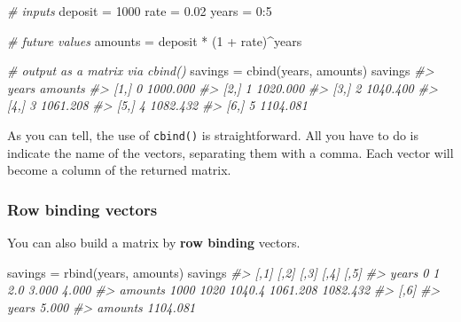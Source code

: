 \documentclass[
]{book}
\newenvironment{Shaded}{\begin{snugshade}}{\end{snugshade}}
\newcommand{\CommentTok}[1]{\textcolor[rgb]{0.56,0.35,0.01}{\textit{#1}}}
\newcommand{\DecValTok}[1]{\textcolor[rgb]{0.00,0.00,0.81}{#1}}
\newcommand{\FloatTok}[1]{\textcolor[rgb]{0.00,0.00,0.81}{#1}}
\newcommand{\FunctionTok}[1]{\textcolor[rgb]{0.00,0.00,0.00}{#1}}
\newcommand{\NormalTok}[1]{#1}
\newcommand{\OtherTok}[1]{\textcolor[rgb]{0.56,0.35,0.01}{#1}}
\newcommand{\SpecialCharTok}[1]{\textcolor[rgb]{0.00,0.00,0.00}{#1}}
\begin{document}
\begin{Shaded}
\begin{Highlighting}[]
\CommentTok{\# inputs}
\NormalTok{deposit }\OtherTok{=} \DecValTok{1000}
\NormalTok{rate }\OtherTok{=} \FloatTok{0.02}
\NormalTok{years }\OtherTok{=} \DecValTok{0}\SpecialCharTok{:}\DecValTok{5}

\CommentTok{\# future values}
\NormalTok{amounts }\OtherTok{=}\NormalTok{ deposit }\SpecialCharTok{*}\NormalTok{ (}\DecValTok{1} \SpecialCharTok{+}\NormalTok{ rate)}\SpecialCharTok{\^{}}\NormalTok{years}

\CommentTok{\# output as a matrix via cbind()}
\NormalTok{savings }\OtherTok{=} \FunctionTok{cbind}\NormalTok{(years, amounts)}
\NormalTok{savings}
\CommentTok{\#\textgreater{}      years  amounts}
\CommentTok{\#\textgreater{} [1,]     0 1000.000}
\CommentTok{\#\textgreater{} [2,]     1 1020.000}
\CommentTok{\#\textgreater{} [3,]     2 1040.400}
\CommentTok{\#\textgreater{} [4,]     3 1061.208}
\CommentTok{\#\textgreater{} [5,]     4 1082.432}
\CommentTok{\#\textgreater{} [6,]     5 1104.081}
\end{Highlighting}
\end{Shaded}

As you can tell, the use of \texttt{cbind()} is straightforward. All you have to do
is indicate the name of the vectors, separating them with a comma. Each vector
will become a column of the returned matrix.

\hypertarget{row-binding-vectors}{%
\subsubsection*{Row binding vectors}\label{row-binding-vectors}}

You can also build a matrix by \textbf{row binding} vectors.

\begin{Shaded}
\begin{Highlighting}[]
\NormalTok{savings }\OtherTok{=} \FunctionTok{rbind}\NormalTok{(years, amounts)}
\NormalTok{savings}
\CommentTok{\#\textgreater{}         [,1] [,2]   [,3]     [,4]     [,5]}
\CommentTok{\#\textgreater{} years      0    1    2.0    3.000    4.000}
\CommentTok{\#\textgreater{} amounts 1000 1020 1040.4 1061.208 1082.432}
\CommentTok{\#\textgreater{}             [,6]}
\CommentTok{\#\textgreater{} years      5.000}
\CommentTok{\#\textgreater{} amounts 1104.081}
\end{Highlighting}
\end{Shaded}
\end{document}
